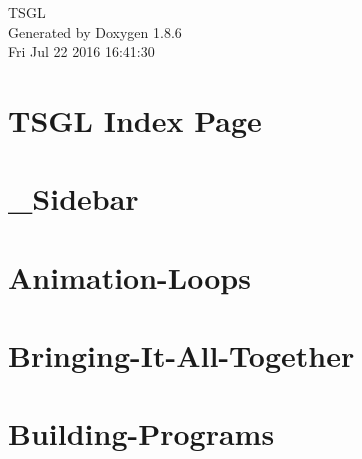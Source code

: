 \documentclass[twoside]{book}
\newcommand{\clearemptydoublepage}{%
  \newpage{\pagestyle{empty}\cleardoublepage}%
}
\begin{document}
\hypersetup{pageanchor=false}
\begin{titlepage}
\vspace*{7cm}
\begin{center}%
{\Large T\-S\-G\-L }\\
\vspace*{1cm}
{\large Generated by Doxygen 1.8.6}\\
\vspace*{0.5cm}
{\small Fri Jul 22 2016 16:41:30}\\
\end{center}
\end{titlepage}
\clearemptydoublepage
\tableofcontents
\clearemptydoublepage
{}
\hypersetup{pageanchor=true}

\chapter{T\-S\-G\-L Index Page}
\label{index}\hypertarget{index}{}
\chapter{\-\_\-\-Sidebar}
\label{md__home_kodemonkey_workspace__t_s_g_l_docs-wiki___sidebar}
\hypertarget{md__home_kodemonkey_workspace__t_s_g_l_docs-wiki___sidebar}{}

\chapter{Animation-\/\-Loops}
\label{md__home_kodemonkey_workspace__t_s_g_l_docs-wiki__animation-_loops}
\hypertarget{md__home_kodemonkey_workspace__t_s_g_l_docs-wiki__animation-_loops}{}

\chapter{Bringing-\/\-It-\/\-All-\/\-Together}
\label{md__home_kodemonkey_workspace__t_s_g_l_docs-wiki__bringing-_it-_all-_together}
\hypertarget{md__home_kodemonkey_workspace__t_s_g_l_docs-wiki__bringing-_it-_all-_together}{}

\chapter{Building-\/\-Programs}
\label{md__home_kodemonkey_workspace__t_s_g_l_docs-wiki__building-_programs}
\hypertarget{md__home_kodemonkey_workspace__t_s_g_l_docs-wiki__building-_programs}{}

\end{document}
